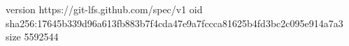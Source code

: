 version https://git-lfs.github.com/spec/v1
oid sha256:17645b339d96a613fb883b7f4cda47e9a7fccca81625b4fd3bc2c095e914a7a3
size 5592544
